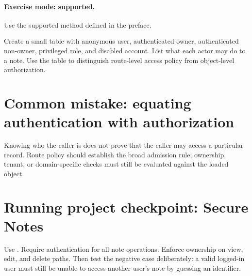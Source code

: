 \paragraph{Exercise mode: supported.} Use the supported method defined in the preface.

Create a small table with anonymous user, authenticated owner, authenticated non-owner, privileged role, and disabled account. List what each actor may do to a note. Use the table to distinguish route-level access policy from object-level authorization.

\section{Common mistake: equating authentication with authorization}
Knowing who the caller is does not prove that the caller may access a particular record. Route policy should establish the broad admission rule; ownership, tenant, or domain-specific checks must still be evaluated against the loaded object.

\section{Running project checkpoint: Secure Notes}
Use . Require authentication for all note operations. Enforce ownership on view, edit, and delete paths. Then test the negative case deliberately: a valid logged-in user must still be unable to access another user's note by guessing an identifier.
